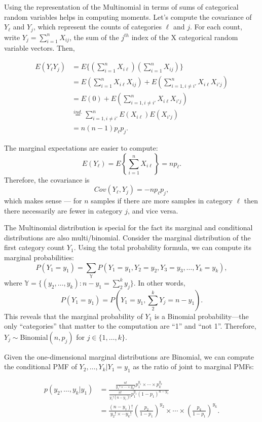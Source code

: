 \documentclass[]{book}
\begin{document}
Using the representation of the Multinomial in terms of sums of
categorical random variables helps in computing moments. Let's compute
the covariance of \(Y_\ell\) and \(Y_j\), which represent the counts of
categories \(\ell\) and \(j\). For each count, write
\(Y_j = \sum_{i=1}^nX_{ij}\), the sum of the \(j^{th}\) index of the X
categorical random variable vectors. Then,

\begin{align*}
E(Y_\ell Y_j) &= E\{(\sum_{i=1}^n X_{i\ell})(\sum_{i=1}^n X_{ij})\}\\
& = E(\sum_{i=1}^n X_{i\ell}X_{ij}) + E(\sum_{i=1,i\ne i'}^n X_{i\ell}X_{i'j})\\
& = E(0) + E(\sum_{i=1,i\ne i'}^n X_{i\ell}X_{i'j})\\
& \stackrel{ind.}{=}  \sum_{i=1,i\ne i'}^n E(X_{i\ell})E(X_{i'j})\\
& = n(n-1)p_\ell p_j.
\end{align*}

The marginal expectations are easier to compute:
\[E(Y_\ell) = E\left\{\sum_{i=1}^n X_{i\ell}\right\} = np_\ell.\]
Therefore, the covariance is \[Cov(Y_\ell, Y_j) = -np_\ell p_j,\] which
makes sense --- for \(n\) samples if there are more samples in category
\(\ell\) then there necessarily are fewer in category \(j\), and vice
versa.

The Multinomial distribution is special for the fact its marginal and
conditional distributions are also multi/binomial. Consider the marginal
distribution of the first category count \(Y_1\). Using the total
probability formula, we can compute its marginal probabilities:
\[P(Y_1 = y_1) = \sum_{\mathbb{Y}}P(Y_1 = y_1, Y_2 = y_2, Y_3 = y_3, \ldots,Y_k = y_k),\]
where \(\mathbb{Y} = \{(y_2, \ldots, y_k): n-y_1 =\sum_{2}^k y_j\}\). In
other words, \[P(Y_1 = y_1) = P(Y_1 = y_1, \sum_2^k Y_j = n - y_1).\]
This reveals that the marginal probability of \(Y_1\) is a Binomial
probability---the only ``categories'' that matter to the computation are
``1'' and ``not 1''. Therefore, \(Y_j \sim\)Binomial\((n,p_j)\) for
\(j \in \{1,\ldots,k\}\).

Given the one-dimensional marginal distributions are Binomial, we can
compute the conditional PMF of \(Y_2,\ldots, Y_k|Y_1 = y_1\) as the
ratio of joint to marginal PMFs:

\begin{align*}
p(y_2, \ldots, y_k|y_1) &= \frac{\frac{n!}{y_1!\times \cdots \times y_k!} p_1^{y_1}\times \cdots \times p_k^{y_k}}{ \frac{n!}{y_1! (n-y_1)!} p_1^{y_1}(1-p_1)^{n-y_1}}\\
& = \frac{(n-y_1)!}{y_2!\times \cdots y_k!}\left(\frac{p_2}{1-p_1}\right)^{y_2}\times \cdots \times \left(\frac{p_k}{1-p_1}\right)^{y_k}.
\end{align*}
\end{document}

